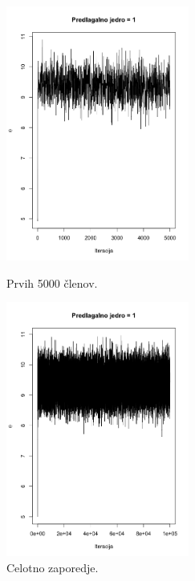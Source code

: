 \documentclass[a4paper,11pt]{article}
\begin{document}
    \begin{figure}[ht!]
        \begin{minipage}{0.5\textwidth}
            \centering
            \includegraphics[width = 60mm]{Slike/4_1d_S_s.png}
            \caption{Prvih 5000 členov.}
        \end{minipage}
        \begin{minipage}{0.5\textwidth}
            \centering
            \includegraphics[width = 60mm]{Slike/4_ad_celotno_s.png}
            \caption{Celotno zaporedje.}
        \end{minipage}
    \end{figure}
\end{document}
